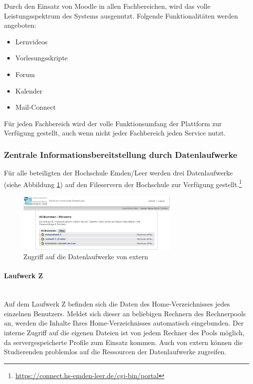 Durch den Einsatz von Moodle in allen Fachbereichen, wird das volle Leistungsspektrum des Systems ausgenutzt. Folgende Funktionalitäten werden angeboten:
\begin{itemize}
	\item Lernvideos
	\item Vorlesungsskripte
	\item Forum
	\item Kalender
	\item Mail-Connect
\end{itemize}

Für jeden Fachbereich wird der volle Funktionsumfang der Plattform zur Verfügung gestellt, auch wenn nicht jeder Fachbereich jeden Service nutzt. 

\subsubsection{Zentrale Informationsbereitstellung durch Datenlaufwerke}
Für alle beteiligten der Hochschule Emden/Leer werden drei Datenlaufwerke (siehe Abbildung \ref{fig_zugriff_datenlaufwerke_extern}) auf den Fileservern der Hochschule zur Verfügung gestellt.\footnote{\url{https://connect.hs-emden-leer.de/cgi-bin/portal}}

\begin{figure}[h!]
	\centering
	\includegraphics[width=8cm]{kapitel/gruppe2/bilder/zugriff_auf_laufwerke_extern}
	\caption{Zugriff auf die Datenlaufwerke von extern}
	\label{fig_zugriff_datenlaufwerke_extern}
\end{figure}


\paragraph{Laufwerk Z}\mbox{} \\

Auf dem Laufwerk Z befinden sich die Daten des Home-Verzeichnisses jedes einzelnen Benutzers. Meldet sich dieser an beliebigen Rechnern des Rechnerpools an, werden die Inhalte Ihres Home-Verzeichnisses automatisch eingebunden. Der interne Zugriff auf die eigenen Dateien ist von jedem Rechner des Pools möglich, da servergespeicherte Profile zum Einsatz kommen. Auch von extern können die Studierenden problemlos auf die Ressourcen der Datenlaufwerke zugreifen.

